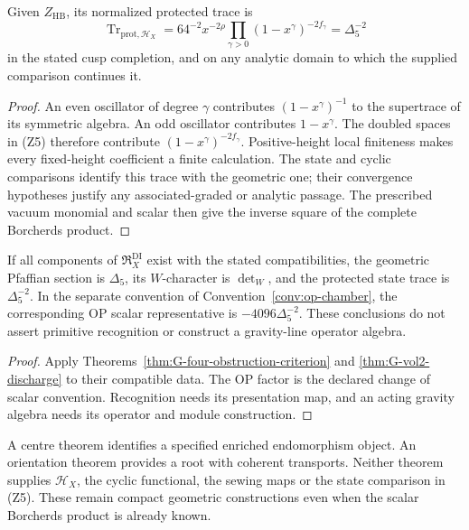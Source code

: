 \begin{theorem}
\label{thm:G-vol2-discharge}
Given \(Z_{\mathrm{HB}}\), its normalized protected trace is
\[
 \operatorname{Tr}_{\mathrm{prot},\mathcal H_X}
       =64^{-2}x^{-2\rho}
          \prod_{\gamma>0}(1-x^\gamma)^{-2f_\gamma}
       =\Delta_5^{-2}
\]
in the stated cusp completion, and on any analytic domain to which
the supplied comparison continues it.
\end{theorem}
\begin{proof}
An even oscillator of degree \(\gamma\) contributes
\((1-x^\gamma)^{-1}\) to the supertrace of its symmetric
algebra. An odd oscillator contributes \(1-x^\gamma\).
The doubled spaces in \textup{(Z5)} therefore contribute
\((1-x^\gamma)^{-2f_\gamma}\). Positive-height local
finiteness makes every fixed-height coefficient a finite
calculation. The state and cyclic comparisons identify this trace
with the geometric one; their convergence hypotheses justify any
associated-graded or analytic passage. The prescribed vacuum
monomial and scalar then give the inverse square of the complete
Borcherds product.
\end{proof}

\begin{theorem}
\label{thm:G-pfaffian-dirac-relative}
If all components of \(\mathfrak R_X^{\mathrm{DI}}\) exist with
the stated compatibilities, the geometric Pfaffian section is
\(\Delta_5\), its \(W\)-character is \(\det_W\), and the
protected state trace is \(\Delta_5^{-2}\). In the separate
convention of Convention~\ref{conv:op-chamber}, the corresponding
OP scalar representative is \(-4096\Delta_5^{-2}\).
These conclusions do not assert primitive recognition or construct
a gravity-line operator algebra.
\end{theorem}
\begin{proof}
Apply Theorems~\ref{thm:G-four-obstruction-criterion} and
\ref{thm:G-vol2-discharge} to their compatible data. The OP factor
is the declared change of scalar convention. Recognition needs
its presentation map, and an acting gravity algebra needs its
operator and module construction.
\end{proof}

\begin{remark}
\label{rem:G-conditioning-clean}
A centre theorem identifies a specified enriched endomorphism
object. An orientation theorem provides a root with coherent
transports. Neither theorem supplies \(\mathcal H_X\), the
cyclic functional, the sewing maps or the state comparison in
\textup{(Z5)}. These remain compact geometric constructions even
when the scalar Borcherds product is already known.
\end{remark}

